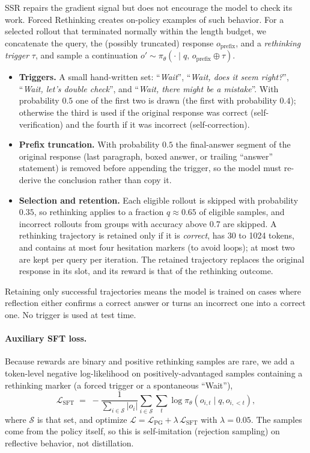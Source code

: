\documentclass{article}
\begin{document}
SSR repairs the gradient signal but does not encourage the model to check its work. Forced Rethinking creates on-policy examples of such behavior. For a selected rollout that terminated normally within the length budget, we concatenate the query, the (possibly truncated) response $o_{\text{prefix}}$, and a \emph{rethinking trigger} $\tau$, and sample a continuation $o'\sim\pi_\theta(\cdot\mid q,\,o_{\text{prefix}}\oplus\tau)$.
\begin{itemize}[leftmargin=*,itemsep=1pt,topsep=2pt]
\item \textbf{Triggers.} A small hand-written set: ``\textit{Wait}'', ``\textit{Wait, does it seem right?}'', ``\textit{Wait, let's double check}'', and ``\textit{Wait, there might be a mistake}''. With probability $0.5$ one of the first two is drawn (the first with probability $0.4$); otherwise the third is used if the original response was correct (self-verification) and the fourth if it was incorrect (self-correction).
\item \textbf{Prefix truncation.} With probability $0.5$ the final-answer segment of the original response (last paragraph, boxed answer, or trailing ``answer'' statement) is removed before appending the trigger, so the model must re-derive the conclusion rather than copy it.
\item \textbf{Selection and retention.} Each eligible rollout is skipped with probability $0.35$, so rethinking applies to a fraction $q\approx0.65$ of eligible samples, and incorrect rollouts from groups with accuracy above 0.7 are skipped. A rethinking trajectory is retained only if it is \emph{correct}, has 30 to 1024 tokens, and contains at most four hesitation markers (to avoid loops); at most two are kept per query per iteration. The retained trajectory replaces the original response in its slot, and its reward is that of the rethinking outcome.
\end{itemize}
Retaining only successful trajectories means the model is trained on cases where reflection either confirms a correct answer or turns an incorrect one into a correct one. No trigger is used at test time.

\paragraph{Auxiliary SFT loss.} Because rewards are binary and positive rethinking samples are rare, we add a token-level negative log-likelihood on positively-advantaged samples containing a rethinking marker (a forced trigger or a spontaneous ``Wait''),
\begin{equation}
\mathcal{L}_{\text{SFT}}\;=\;-\frac{1}{\sum_{i\in\mathcal{S}}|o_i|}\sum_{i\in\mathcal{S}}\sum_{t}\log\pi_\theta(o_{i,t}\mid q,o_{i,<t}),
\end{equation}
where $\mathcal{S}$ is that set, and optimize $\mathcal{L}=\mathcal{L}_{\text{PG}}+\lambda\,\mathcal{L}_{\text{SFT}}$ with $\lambda=0.05$. The samples come from the policy itself, so this is self-imitation (rejection sampling) on reflective behavior, not distillation.
\end{document}
